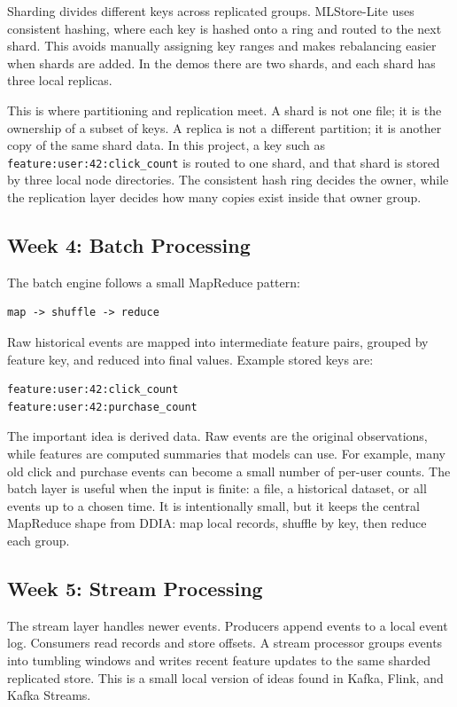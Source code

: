 Sharding divides different keys across replicated groups. MLStore-Lite uses
consistent hashing, where each key is hashed onto a ring and routed to the next
shard. This avoids manually assigning key ranges and makes rebalancing easier
when shards are added. In the demos there are two shards, and each shard has
three local replicas.

This is where partitioning and replication meet. A shard is not one file; it is
the ownership of a subset of keys. A replica is not a different partition; it is
another copy of the same shard data. In this project, a key such as
\texttt{feature:user:42:click\_count} is routed to one shard, and that shard is
stored by three local node directories. The consistent hash ring decides the
owner, while the replication layer decides how many copies exist inside that
owner group.

\subsection{Week 4: Batch Processing}

The batch engine follows a small MapReduce pattern:

\begin{lstlisting}
map -> shuffle -> reduce
\end{lstlisting}

Raw historical events are mapped into intermediate feature pairs, grouped by
feature key, and reduced into final values. Example stored keys are:

\begin{lstlisting}
feature:user:42:click_count
feature:user:42:purchase_count
\end{lstlisting}

The important idea is derived data. Raw events are the original observations,
while features are computed summaries that models can use. For example, many
old click and purchase events can become a small number of per-user counts. The
batch layer is useful when the input is finite: a file, a historical dataset, or
all events up to a chosen time. It is intentionally small, but it keeps the
central MapReduce shape from DDIA: map local records, shuffle by key, then reduce
each group.

\subsection{Week 5: Stream Processing}

The stream layer handles newer events. Producers append events to a local event
log. Consumers read records and store offsets. A stream processor groups events
into tumbling windows and writes recent feature updates to the same sharded
replicated store. This is a small local version of ideas found in Kafka, Flink,
and Kafka Streams.

